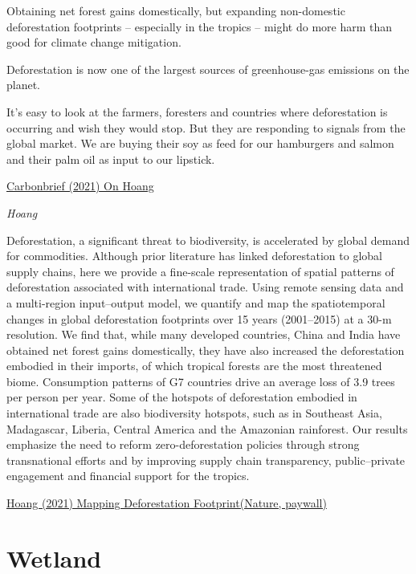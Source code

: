 \documentclass[
]{book}
\begin{document}
Obtaining net forest gains domestically,
but expanding non-domestic deforestation footprints --
especially in the tropics -- might do more harm than good for climate change mitigation.

Deforestation is now one of the largest sources of greenhouse-gas emissions on the planet.

It's easy to look at the farmers, foresters and countries where deforestation is occurring and wish they would stop. But they are responding to signals from the global market. We are buying their soy as feed for our hamburgers and salmon and their palm oil as input to our lipstick.

\href{https://www.carbonbrief.org/scientists-calculate-trade-related-deforestation-footprint-of-rich-countries}{Carbonbrief (2021) On Hoang}

\emph{Hoang}

Deforestation, a significant threat to biodiversity, is accelerated by global demand for commodities. Although prior literature has linked deforestation to global supply chains, here we provide a fine-scale representation of spatial patterns of deforestation associated with international trade. Using remote sensing data and a multi-region input--output model, we quantify and map the spatiotemporal changes in global deforestation footprints over 15 years (2001--2015) at a 30-m resolution. We find that, while many developed countries, China and India have obtained net forest gains domestically, they have also increased the deforestation embodied in their imports, of which tropical forests are the most threatened biome. Consumption patterns of G7 countries drive an average loss of 3.9 trees per person per year. Some of the hotspots of deforestation embodied in international trade are also biodiversity hotspots, such as in Southeast Asia, Madagascar, Liberia, Central America and the Amazonian rainforest. Our results emphasize the need to reform zero-deforestation policies through strong transnational efforts and by improving supply chain transparency, public--private engagement and financial support for the tropics.

\href{https://www.nature.com/articles/s41559-021-01417-z}{Hoang (2021) Mapping Deforestation Footprint(Nature, paywall)}

\hypertarget{wetland}{%
\section{Wetland}\label{wetland}}
\end{document}
